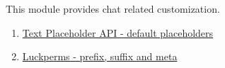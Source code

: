 This module provides chat related customization.



\clearpage


\clearpage


\begin{enumerate}
    \item \href{https://placeholders.pb4.eu/user/default-placeholders/}{Text Placeholder API - default placeholders}
    \item \href{https://luckperms.net/wiki/Prefixes,-Suffixes-&-Meta}{Luckperms - prefix, suffix and meta}
\end{enumerate}
